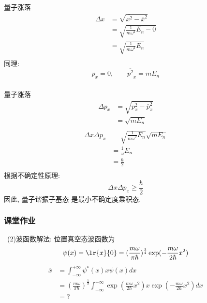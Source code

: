    \begin{frame}
       \frametitle{}
       量子涨落
       \[\begin{aligned}
           \Delta x  &= \sqrt{ \overline{x^2}- \overline{x}^2}  \\ 
           &= \sqrt{ \frac{1}{m\omega^2} E_n- 0}  \\ 
           &= \sqrt{ \frac{1}{m\omega^2} E_n}  \\ 
       \end{aligned} \]
        同理:
    \[\overline{p}_x =0, \qquad \overline{p^2}_x = m E_n\]
   \end{frame}
   
   \begin{frame}
    \frametitle{}

         量子涨落
         \[\begin{aligned}
           \Delta p_x  &= \sqrt{ \overline{p^2 _x}- \overline{p}_x ^2}  \\ 
             &= \sqrt{ m E_n}  \\ 
         \end{aligned} \]
         \[\begin{aligned}
           \Delta x \Delta p_x  &= \sqrt{ \frac{1}{m\omega^2} E_n} \sqrt{ m E_n} \\ 
           &= \frac{1}{\omega} E_n \\ 
           &= \frac{\hbar}{2}  \\
         \end{aligned} \]
         根据不确定性原理: 
         \[ \Delta x \Delta p_x \geq  \frac{\hbar}{2}  \]
         因此, 量子谐振子基态 是最小不确定度乘积态.
   \end{frame}

    \begin{frame}
        \frametitle{课堂作业}
        \解~(2)波函数解法: 位置真空态波函数为\[ \psi(x)=\lr{x}{0} = (\frac{m \omega }{\pi  \hbar})^{\frac{1}{4}}  \exp(- \frac{m \omega }{2 \hbar} x^2)\] 
        \[\begin{aligned}
            \overline{x} & = \int_{-\infty}^{+\infty} \psi^{*}(x) x \psi(x) d x  \\ 
            &= (\frac{m \omega }{\pi  \hbar})^{\frac{1}{2}}  \int_{-\infty}^{+\infty} \exp(\frac{m \omega }{2 \hbar} x^2) x \exp(- \frac{m \omega }{2 \hbar} x^2) d x  \\ 
            &= ? 
        \end{aligned} \]
    \end{frame}  

